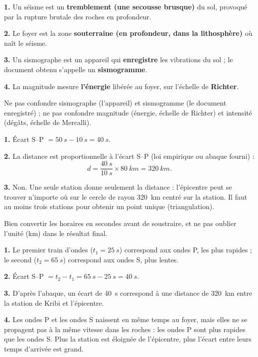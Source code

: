 \documentclass[11pt]{article}
\begin{document}
\begin{corrige}
\textbf{1.} Un séisme est un \textbf{tremblement (une secousse brusque)} du sol, provoqué par la rupture brutale des roches en profondeur.

\textbf{2.} Le foyer est la zone \textbf{souterraine (en profondeur, dans la lithosphère)} où naît le séisme.

\textbf{3.} Un sismographe est un appareil qui \textbf{enregistre} les vibrations du sol ; le document obtenu s'appelle un \textbf{sismogramme}.

\textbf{4.} La magnitude mesure \textbf{l'énergie} libérée au foyer, sur l'échelle de \textbf{Richter}.

\begin{attention}
Ne pas confondre sismographe (l'appareil) et sismogramme (le document enregistré) ; ne pas confondre magnitude (énergie, échelle de Richter) et intensité (dégâts, échelle de Mercalli).
\end{attention}
\end{corrige}

\begin{corrige}
\textbf{1.} Écart S--P $= \SI{50}{s} - \SI{10}{s} = \SI{40}{s}$.

\textbf{2.} La distance est proportionnelle à l'écart S--P (loi empirique ou abaque fourni) :
\[ d = \frac{\SI{40}{s}}{\SI{10}{s}} \times \SI{80}{km} = \SI{320}{km}. \]

\textbf{3.} Non. Une seule station donne seulement la distance : l'épicentre peut se trouver n'importe où sur le cercle de rayon \SI{320}{km} centré sur la station. Il faut au moins trois stations pour obtenir un point unique (triangulation).

\begin{attention}
Bien convertir les horaires en secondes avant de soustraire, et ne pas oublier l'unité (km) dans le résultat final.
\end{attention}
\end{corrige}

\begin{corrige}
\textbf{1.} Le premier train d'ondes ($t_1 = \SI{25}{s}$) correspond aux ondes P, les plus rapides ; le second ($t_2 = \SI{65}{s}$) correspond aux ondes S, plus lentes.

\textbf{2.} Écart S--P $= t_2 - t_1 = \SI{65}{s} - \SI{25}{s} = \SI{40}{s}$.

\textbf{3.} D'après l'abaque, un écart de \SI{40}{s} correspond à une distance de \SI{320}{km} entre la station de Kribi et l'épicentre.

\textbf{4.} Les ondes P et les ondes S naissent en même temps au foyer, mais elles ne se propagent pas à la même vitesse dans les roches : les ondes P sont plus rapides que les ondes S. Plus la station est éloignée de l'épicentre, plus l'écart entre leurs temps d'arrivée est grand.
\end{corrige}
\end{document}
